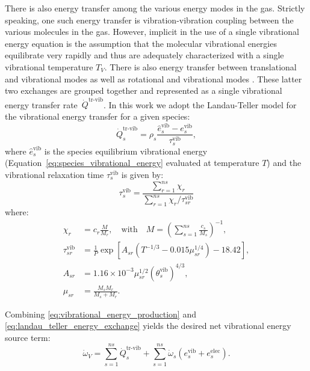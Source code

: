\documentclass[10pt]{article}
\newcommand{\vib}{\text{vib}}
\begin{document}
There is also energy transfer among the various energy modes in the gas.  Strictly speaking, one such energy transfer is vibration-vibration coupling between the various molecules in the gas.  However, implicit in the use of a single vibrational energy equation is the assumption that the molecular vibrational energies equilibrate very rapidly and thus are adequately characterized with a single vibrational temperature $T_V$.  There is also energy transfer between translational and vibrational modes as well as rotational and vibrational modes \citep{Kirk2009}.  These latter two exchanges are grouped together and represented as a single vibrational energy transfer rate~$\dot{Q}^{\text{tr-vib}}$.  
In this work we adopt the Landau-Teller model for the vibrational energy transfer for a given species:
\begin{equation}
  \label{eq:landau_teller_energy_exchange}
  \dot{Q}^{\text{tr-vib}}_s = \rho_s \frac{\hat{e}^{\text{vib}}_{s} - e^{\text{vib}}_s}{\tau^{\text{vib}}_s},
\end{equation}
where $\hat{e}^{\text{vib}}_{s}$ is the species equilibrium vibrational energy (Equation~\eqref{eq:species_vibrational_energy} evaluated at temperature $T$) and the vibrational relaxation time $\tau^{\text{vib}}_s$ is given by:
\begin{equation*}
  \tau^{\text{vib}}_s = \frac{\sum_{r=1}^{ns} \chi_r}{\sum_{r=1}^{ns} \chi_r/\tau^{\text{vib}}_{sr}}
\end{equation*}
where: 
\begin{align*}
  \label{eq:tau_vib_sr}
\chi_r &= c_r\frac{M}{M_r},\quad \mbox{with}\quad M=\left(\sum_{s=1}^{ns}\frac{c_s}{M_s}\right)^{-1},\\
  \tau^{\text{vib}}_{sr} &=  \frac{1}{P} \exp\left[A_{sr}\left(T^{-1/3} - 0.015 \mu^{1/4}_{sr}\right) - 18.42\right] ,\\
          A_{sr} &= 1.16\times 10^{-3} \mu^{1/2}_{sr}(\theta_{s}^\vib)^{4/3} ,\\
        \mu_{sr} &= \frac{M_s M_r}{M_s + M_r}.
\end{align*}


Combining \eqref{eq:vibrational_energy_production} and \eqref{eq:landau_teller_energy_exchange} yields the desired net vibrational energy source term:
\begin{equation*}
  \dot{\omega}_V = \sum_{s=1}^{ns} \dot{Q}^{\text{tr-vib}}_s + \sum_{s=1}^{ns} \dot{\omega}_s\left(e^{\text{vib}}_{s} + e^{\text{elec}}_{s}\right).
\end{equation*}
\end{document}
